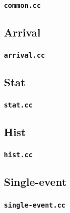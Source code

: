 \begin{scriptsize}

\end{scriptsize}

\subsubsection{\texttt{common.cc}}

\begin{scriptsize}

\end{scriptsize}

\subsection{Arrival}

\subsubsection{\texttt{arrival.cc}}

\begin{scriptsize}

\end{scriptsize}

\subsection{Stat}

\subsubsection{\texttt{stat.cc}}

\begin{scriptsize}

\end{scriptsize}

\subsection{Hist}

\subsubsection{\texttt{hist.cc}}

\begin{scriptsize}

\end{scriptsize}

\subsection{Single-event}

\subsubsection{\texttt{single-event.cc}}

\begin{scriptsize}

\end{scriptsize}

\renewcommand{\baselinestretch}{1.5}